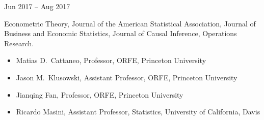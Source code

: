 \documentclass[
  date,
  number,
]{wgu-cv}
\begin{document}
{}
{Jun 2017 -- Aug 2017}


Econometric Theory,
Journal of the American Statistical Association,
Journal of Business and Economic Statistics,
Journal of Causal Inference,
Operations Research.


\vspace*{-2mm}

\begin{itemize}

  \item
    Matias D.\ Cattaneo,
    Professor,
    ORFE,
    Princeton University

  \item
    Jason M.\ Klusowski,
    Assistant Professor,
    ORFE,
    Princeton University

  \item
    Jianqing Fan,
    Professor,
    ORFE,
    Princeton University

  \item
    Ricardo Masini,
    Assistant Professor,
    Statistics,
    University of California, Davis

\end{itemize}

\end{document}
